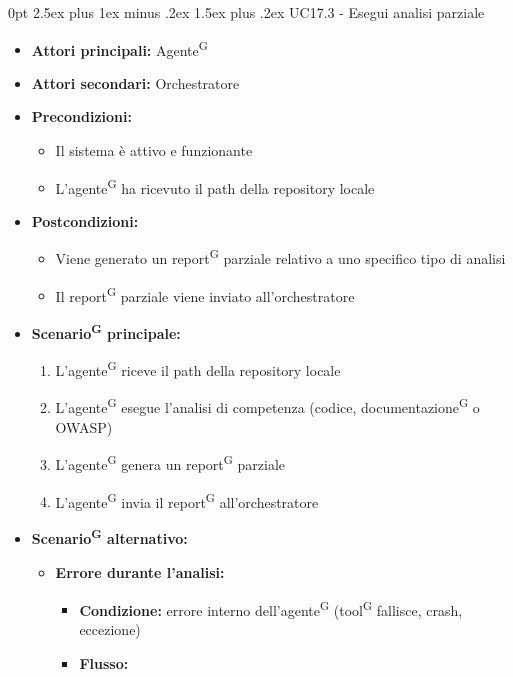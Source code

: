 \documentclass[a4paper, 11pt]{article}
\makeatletter
\renewcommand\paragraph{\@startsection{paragraph}{4}
  {0pt}
  {2.5ex plus 1ex minus .2ex}
  {1.5ex plus .2ex}
  {\normalfont\normalsize\bfseries\color{AccentDark}}}
\makeatother
\begin{document}
\paragraph{UC17.3 - Esegui analisi parziale} \label{UC17.3}
\begin{itemize}
	\item \textbf{Attori principali:} Agente\textsuperscript{G}
	\item \textbf{Attori secondari:} Orchestratore
	\item \textbf{Precondizioni:}
	\begin{itemize}
		\item Il sistema è attivo e funzionante
		\item L'agente\textsuperscript{G} ha ricevuto il path della repository locale
	\end{itemize}
	\item \textbf{Postcondizioni:}
	\begin{itemize}
		\item Viene generato un report\textsuperscript{G} parziale relativo a uno specifico tipo di analisi
		\item Il report\textsuperscript{G} parziale viene inviato all'orchestratore
	\end{itemize}
	\item \textbf{Scenario\textsuperscript{G} principale:}
	\begin{enumerate}
		\item L'agente\textsuperscript{G} riceve il path della repository locale
		\item L'agente\textsuperscript{G} esegue l'analisi di competenza (codice, documentazione\textsuperscript{G} o OWASP)
		\item L'agente\textsuperscript{G} genera un report\textsuperscript{G} parziale
		\item L'agente\textsuperscript{G} invia il report\textsuperscript{G} all'orchestratore
	\end{enumerate}
	\item \textbf{Scenario\textsuperscript{G} alternativo:}
	\begin{itemize}
		\item \textbf{Errore durante l'analisi:}
			\begin{itemize}
				\item \textbf{Condizione:} errore interno dell'agente\textsuperscript{G} (tool\textsuperscript{G} fallisce, crash, eccezione)
				\item \textbf{Flusso:}
				\begin{enumerate}

\end{enumerate}
\end{itemize}
\end{itemize}
\end{itemize}
\end{document}
